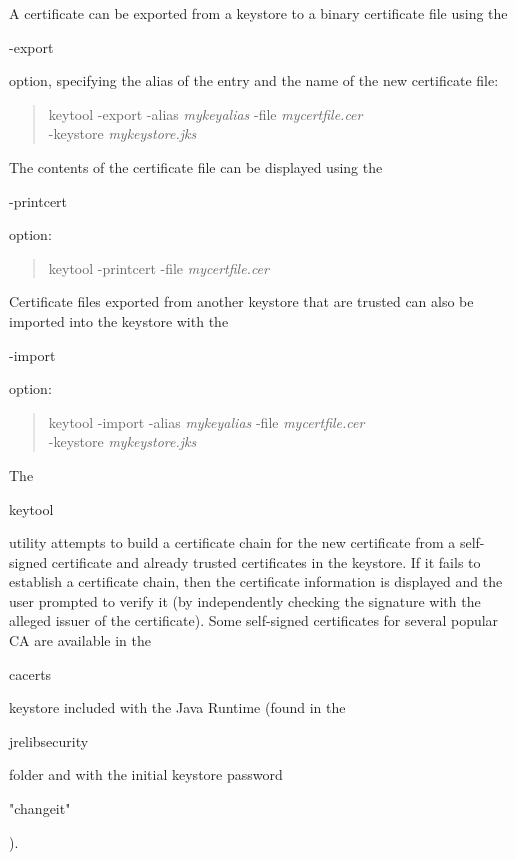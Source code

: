 A certificate can be exported from a keystore to a binary certificate file
using the \begin{code}-export\end{code} option, specifying the alias of the
entry and the name of the new certificate file:
\begin{quote}\begin{code}
keytool -export -alias \emph{mykeyalias} -file \emph{mycertfile.cer} \\
\trind  -keystore \emph{mykeystore.jks}
\end{code}\end{quote}
The contents of the certificate file can be displayed using the
\begin{code}-printcert\end{code} option:
\begin{quote}\begin{code}
keytool -printcert -file \emph{mycertfile.cer}
\end{code}\end{quote}
Certificate files exported from another keystore that are trusted can also be imported
into the keystore with the \begin{code}-import\end{code} option:
\begin{quote}\begin{code}
keytool -import -alias \emph{mykeyalias} -file \emph{mycertfile.cer} \\
\trind  -keystore \emph{mykeystore.jks}
\end{code}\end{quote}
The \begin{code}keytool\end{code} utility attempts to build a certificate chain for
the new certificate from a self-signed certificate and already trusted certificates
in the keystore.
If it fails to establish a certificate chain, then the certificate information
is displayed and the user prompted to verify it
(by independently checking the signature with the alleged issuer of the certificate).
Some self-signed certificates for several popular CA are available in the
\begin{code}cacerts\end{code} keystore included with the Java Runtime
(found in the \begin{code}jre\bsl lib\bsl security\end{code} folder
and with the initial keystore password \begin{code}"changeit"\end{code}).

